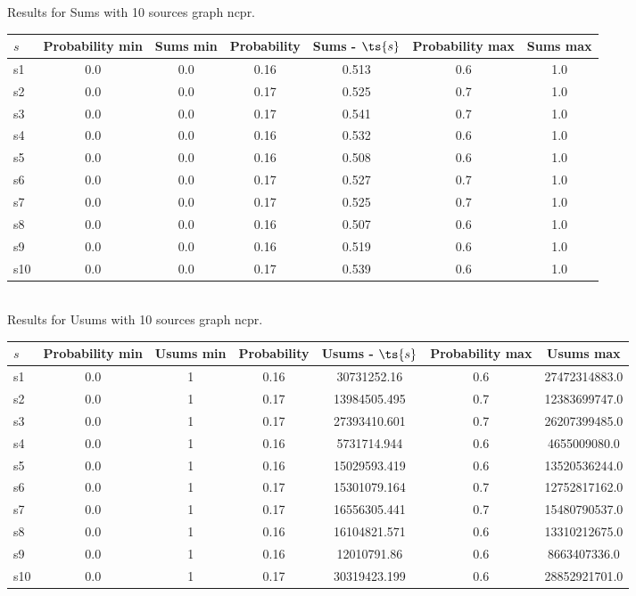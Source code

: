 \documentclass{article}
\begin{document}
\noindent Results for Sums with 10 sources graph ncpr.

\noindent\begin{tabular}{|l|c|c|c|c|c|c|}
\hline
$s$& Probability min & Sums min & Probability & Sums - $\ts{s}$ & Probability max & Sums max\\
\hline
s1 &0.0 & 0.0 & 0.16 & 0.513 & 0.6 & 1.0\\
\hline
s2 &0.0 & 0.0 & 0.17 & 0.525 & 0.7 & 1.0\\
\hline
s3 &0.0 & 0.0 & 0.17 & 0.541 & 0.7 & 1.0\\
\hline
s4 &0.0 & 0.0 & 0.16 & 0.532 & 0.6 & 1.0\\
\hline
s5 &0.0 & 0.0 & 0.16 & 0.508 & 0.6 & 1.0\\
\hline
s6 &0.0 & 0.0 & 0.17 & 0.527 & 0.7 & 1.0\\
\hline
s7 &0.0 & 0.0 & 0.17 & 0.525 & 0.7 & 1.0\\
\hline
s8 &0.0 & 0.0 & 0.16 & 0.507 & 0.6 & 1.0\\
\hline
s9 &0.0 & 0.0 & 0.16 & 0.519 & 0.6 & 1.0\\
\hline
s10 &0.0 & 0.0 & 0.17 & 0.539 & 0.6 & 1.0\\
\hline
\end{tabular}\\

\noindent Results for Usums with 10 sources graph ncpr.

\noindent\begin{tabular}{|l|c|c|c|c|c|c|}
\hline
$s$& Probability min & Usums min & Probability & Usums - $\ts{s}$ & Probability max & Usums max\\
\hline
s1 &0.0 & 1 & 0.16 & 30731252.16 & 0.6 & 27472314883.0\\
\hline
s2 &0.0 & 1 & 0.17 & 13984505.495 & 0.7 & 12383699747.0\\
\hline
s3 &0.0 & 1 & 0.17 & 27393410.601 & 0.7 & 26207399485.0\\
\hline
s4 &0.0 & 1 & 0.16 & 5731714.944 & 0.6 & 4655009080.0\\
\hline
s5 &0.0 & 1 & 0.16 & 15029593.419 & 0.6 & 13520536244.0\\
\hline
s6 &0.0 & 1 & 0.17 & 15301079.164 & 0.7 & 12752817162.0\\
\hline
s7 &0.0 & 1 & 0.17 & 16556305.441 & 0.7 & 15480790537.0\\
\hline
s8 &0.0 & 1 & 0.16 & 16104821.571 & 0.6 & 13310212675.0\\
\hline
s9 &0.0 & 1 & 0.16 & 12010791.86 & 0.6 & 8663407336.0\\
\hline
s10 &0.0 & 1 & 0.17 & 30319423.199 & 0.6 & 28852921701.0\\
\hline
\end{tabular}\\
\end{document}
